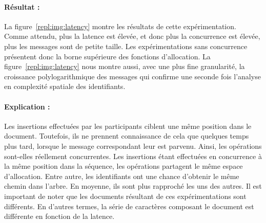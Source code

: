 \paragraph{Résultat :} La figure~\ref{repl:img:latency} montre les résultats de
cette expérimentation. Comme attendu, plus la latence est élevée, et donc plus
la concurrence est élevée, plus les messages sont de petite taille. Les
expérimentations sans concurrence présentent donc la borne supérieure des
fonctions d'allocation. La figure~\ref{repl:img:latency} nous montre aussi, avec
une plus fine granularité, la croissance polylogarithmique des messages qui
confirme une seconde fois l'analyse en complexité spatiale des identifiants.

\paragraph{Explication :} Les insertions effectuées par les participants ciblent
une même position dans le document. Toutefois, ils ne prennent connaissance de
cela que quelques temps plus tard, lorsque le message correspondant leur est
parvenu. Ainsi, les opérations sont-elles réellement concurrentes. Les
insertions étant effectuées en concurrence à la même position dans la séquence,
les opérations partagent le même espace d'allocation. Entre autre, les
identifiants ont une chance d'obtenir le même chemin dans l'arbre. En moyenne,
ils sont plus rapproché les uns des autres. Il est important de noter que les
documents résultant de ces expérimentations sont différents. En d'autres termes,
la série de caractères composant le document est différente en fonction de la
latence.



